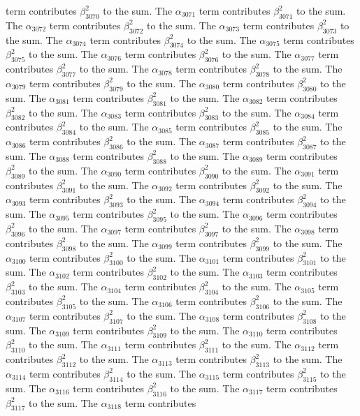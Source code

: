 \begin{lemma}
term contributes $\beta_{3070}^{2}$ to the sum. The $\alpha_{3071}$ term contributes $\beta_{3071}^{2}$ to the sum. The $\alpha_{3072}$ term contributes $\beta_{3072}^{2}$ to the sum. The $\alpha_{3073}$ term contributes $\beta_{3073}^{2}$ to the sum. The $\alpha_{3074}$ term contributes $\beta_{3074}^{2}$ to the sum. The $\alpha_{3075}$ term contributes $\beta_{3075}^{2}$ to the sum. The $\alpha_{3076}$ term contributes $\beta_{3076}^{2}$ to the sum. The $\alpha_{3077}$ term contributes $\beta_{3077}^{2}$ to the sum. The $\alpha_{3078}$ term contributes $\beta_{3078}^{2}$ to the sum. The $\alpha_{3079}$ term contributes $\beta_{3079}^{2}$ to the sum. The $\alpha_{3080}$ term contributes $\beta_{3080}^{2}$ to the sum. The $\alpha_{3081}$ term contributes $\beta_{3081}^{2}$ to the sum. The $\alpha_{3082}$ term contributes $\beta_{3082}^{2}$ to the sum. The $\alpha_{3083}$ term contributes $\beta_{3083}^{2}$ to the sum. The $\alpha_{3084}$ term contributes $\beta_{3084}^{2}$ to the sum. The $\alpha_{3085}$ term contributes $\beta_{3085}^{2}$ to the sum. The $\alpha_{3086}$ term contributes $\beta_{3086}^{2}$ to the sum. The $\alpha_{3087}$ term contributes $\beta_{3087}^{2}$ to the sum. The $\alpha_{3088}$ term contributes $\beta_{3088}^{2}$ to the sum. The $\alpha_{3089}$ term contributes $\beta_{3089}^{2}$ to the sum. The $\alpha_{3090}$ term contributes $\beta_{3090}^{2}$ to the sum. The $\alpha_{3091}$ term contributes $\beta_{3091}^{2}$ to the sum. The $\alpha_{3092}$ term contributes $\beta_{3092}^{2}$ to the sum. The $\alpha_{3093}$ term contributes $\beta_{3093}^{2}$ to the sum. The $\alpha_{3094}$ term contributes $\beta_{3094}^{2}$ to the sum. The $\alpha_{3095}$ term contributes $\beta_{3095}^{2}$ to the sum. The $\alpha_{3096}$ term contributes $\beta_{3096}^{2}$ to the sum. The $\alpha_{3097}$ term contributes $\beta_{3097}^{2}$ to the sum. The $\alpha_{3098}$ term contributes $\beta_{3098}^{2}$ to the sum. The $\alpha_{3099}$ term contributes $\beta_{3099}^{2}$ to the sum. The $\alpha_{3100}$ term contributes $\beta_{3100}^{2}$ to the sum. The $\alpha_{3101}$ term contributes $\beta_{3101}^{2}$ to the sum. The $\alpha_{3102}$ term contributes $\beta_{3102}^{2}$ to the sum. The $\alpha_{3103}$ term contributes $\beta_{3103}^{2}$ to the sum. The $\alpha_{3104}$ term contributes $\beta_{3104}^{2}$ to the sum. The $\alpha_{3105}$ term contributes $\beta_{3105}^{2}$ to the sum. The $\alpha_{3106}$ term contributes $\beta_{3106}^{2}$ to the sum. The $\alpha_{3107}$ term contributes $\beta_{3107}^{2}$ to the sum. The $\alpha_{3108}$ term contributes $\beta_{3108}^{2}$ to the sum. The $\alpha_{3109}$ term contributes $\beta_{3109}^{2}$ to the sum. The $\alpha_{3110}$ term contributes $\beta_{3110}^{2}$ to the sum. The $\alpha_{3111}$ term contributes $\beta_{3111}^{2}$ to the sum. The $\alpha_{3112}$ term contributes $\beta_{3112}^{2}$ to the sum. The $\alpha_{3113}$ term contributes $\beta_{3113}^{2}$ to the sum. The $\alpha_{3114}$ term contributes $\beta_{3114}^{2}$ to the sum. The $\alpha_{3115}$ term contributes $\beta_{3115}^{2}$ to the sum. The $\alpha_{3116}$ term contributes $\beta_{3116}^{2}$ to the sum. The $\alpha_{3117}$ term contributes $\beta_{3117}^{2}$ to the sum. The $\alpha_{3118}$ term contributes 
\end{lemma}
